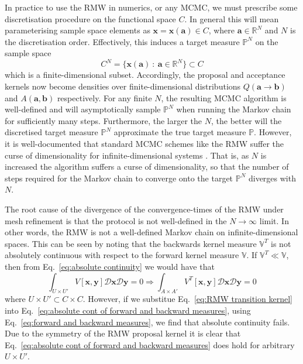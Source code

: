 

In practice to use the RMW in numerics, or any MCMC, we must prescribe some discretisation procedure on the functional space $C$. In general this will mean parameterising sample space elements as $\mathbf{x} = \mathbf{x}(\mathbf{a}) \in C$, where $\mathbf{a} \in \mathbb{R}^N$ and $N$ is the discretisation order. Effectively, this induces a target measure $\mathbb{P}^N$ on the sample space
\begin{equation}
	C^N = \{ \mathbf{x}(\mathbf{a})\ :\ \mathbf{a} \in \mathbb{R}^N \} \subset C
\end{equation}
which is a finite-dimensional subset. Accordingly, the proposal and acceptance kernels now become densities over finite-dimensional distributions $Q(\mathbf{a} \to \mathbf{b})$ and $A(\mathbf{a}, \mathbf{b})$ respectively. For any finite $N$, the resulting MCMC algorithm is well-defined and will asymptotically sample $\mathbb{P}^N$ when running the Markov chain for sufficiently many steps. Furthermore, the larger the $N$, the better will the discretised target measure $\mathbb{P}^N$ approximate the true target measure $\mathbb{P}$. However, it is well-documented that standard MCMC schemes like the RMW suffer the curse of dimensionality for infinite-dimensional systems \citep{cotterMCMCMethodsFunctions2013, hairerSpectralGapsMetropolis2014}. That is, as $N$ is increased the algorithm suffers a curse of dimensionality, so that the number of steps required for the Markov chain to converge onto the target $\mathbb{P}^N$ diverges with $N$.

The root cause of the divergence of the convergence-times of the RMW under mesh refinement is that the protocol is not well-defined in the $N \to \infty$ limit. In other words, the RMW is not a well-defined Markov chain on infinite-dimensional spaces. This can be seen by noting that the backwards kernel measure $\mathbb{V}^T$ is not absolutely continuous with respect to the forward kernel measure $\mathbb{V}$. If $\mathbb{V}^T \ll \mathbb{V}$, then from Eq.~\ref{eq:absolute continuity} we would have that
\begin{equation} \label{eq:absolute cont of forward and backward measures}
	\int_{U \times U'} V[\mathbf{x}, \mathbf{y}] \mathcal{D}\mathbf{x} \mathcal{D}\mathbf{y} = 0 \Rightarrow  \int_{A \times A'} V^T[\mathbf{x}, \mathbf{y}] \mathcal{D}\mathbf{x} \mathcal{D}\mathbf{y} = 0
\end{equation}
where $U \times U' \subset C \times C$. However, if we substitue Eq.~\ref{eq:RMW transition kernel} into Eq.~\ref{eq:absolute cont of forward and backward measures}, using Eq.~\ref{eq:forward and backward measures}, we find that absolute continuity fails. Due to the symmetry of the RMW proposal kernel it is clear that Eq.~\ref{eq:absolute cont of forward and backward measures} does hold for arbitrary $U \times U'$.

